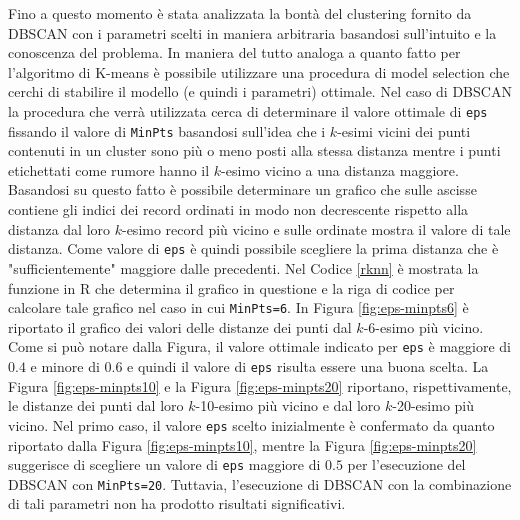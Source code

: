 \documentclass[12pt]{article}
\begin{document}
Fino a questo momento è stata analizzata la bontà del clustering fornito da DBSCAN con i parametri scelti in maniera arbitraria basandosi sull'intuito e la conoscenza del problema. 
In maniera del tutto analoga a quanto fatto per l'algoritmo di K-means è possibile utilizzare una procedura di model selection che cerchi di stabilire il modello (e quindi i parametri) ottimale. Nel caso di DBSCAN la procedura che verrà utilizzata cerca di determinare il valore ottimale di \texttt{eps} fissando il valore di \texttt{MinPts} basandosi sull'idea che i $k$-esimi vicini dei punti contenuti in un cluster sono più o meno posti alla stessa distanza mentre i punti etichettati come rumore hanno il $k$-esimo vicino a una distanza maggiore. 
Basandosi su questo fatto è possibile determinare un grafico che sulle ascisse contiene gli indici dei record ordinati in modo non decrescente rispetto alla distanza dal loro $k$-esimo record più vicino e sulle ordinate mostra il valore di tale distanza. 
Come valore di \texttt{eps} è quindi possibile scegliere la prima distanza che è "sufficientemente" maggiore dalle precedenti. 
Nel Codice \ref{rknn} è mostrata la funzione in R che determina il grafico in questione e la riga di codice per calcolare tale grafico nel caso in cui \texttt{MinPts=6}. 
In Figura \ref{fig:eps-minpts6} è riportato il grafico dei valori delle distanze dei punti dal $k$-6-esimo più vicino. 
Come si può notare dalla Figura, il valore ottimale indicato per \texttt{eps} è maggiore di $0.4$ e minore di $0.6$ e quindi il valore di \texttt{eps} risulta essere una buona scelta. 
La Figura \ref{fig:eps-minpts10} e la Figura \ref{fig:eps-minpts20} riportano, rispettivamente, le distanze dei punti dal loro $k$-10-esimo più vicino e dal loro $k$-20-esimo più vicino. 
Nel primo caso, il valore \texttt{eps} scelto inizialmente è confermato da quanto riportato dalla Figura \ref{fig:eps-minpts10}, mentre la Figura \ref{fig:eps-minpts20} suggerisce di scegliere un valore di \texttt{eps} maggiore di $0.5$ per l'esecuzione del DBSCAN con \texttt{MinPts=20}. 
Tuttavia, l'esecuzione di DBSCAN con la combinazione di tali parametri non ha prodotto risultati significativi.
\end{document}
